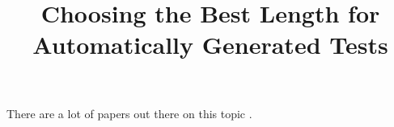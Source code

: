 \documentclass{IEEEtran}
\title{Choosing the Best Length for Automatically Generated Tests}
\author{}
\begin{document}


There are a lot of papers out there on this topic \cite{ASE08}.



\end{document}
